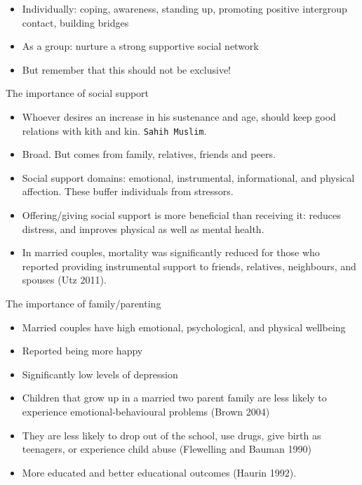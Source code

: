 \documentclass[
  ignorenonframetext,
  aspectratio=169,
]{beamer}
\providecommand{\tightlist}{%
  \setlength{\itemsep}{0pt}\setlength{\parskip}{0pt}}\usepackage{longtable,booktabs,array}
\begin{document}
\begin{frame}
\begin{itemize}[<+->]
\tightlist
\item
  Individually: coping, awareness, standing up, promoting positive
  intergroup contact, building bridges
\item
  As a group: nurture a strong supportive social network
\item
  But remember that this should not be exclusive!
\end{itemize}
\end{frame}

\begin{frame}[fragile]{The importance of social support}
\label{the-importance-of-social-support}
\begin{itemize}[<+->]
\tightlist
\item
  Whoever desires an increase in his sustenance and age, should keep
  good relations with kith and kin. \texttt{Sahih\ Muslim}.
\item
  Broad. But comes from family, relatives, friends and peers.
\item
  Social support domains: emotional, instrumental, informational, and
  physical affection. These buffer individuals from stressors.
\item
  Offering/giving social support is more beneficial than receiving it:
  reduces distress, and improves physical as well as mental health.
\item
  In married couples, mortality was significantly reduced for those who
  reported providing instrumental support to friends, relatives,
  neighbours, and spouses (Utz 2011).
\end{itemize}
\end{frame}

\begin{frame}{The importance of family/parenting}
\label{the-importance-of-familyparenting}
\begin{itemize}[<+->]
\tightlist
\item
  Married couples have high emotional, psychological, and physical
  wellbeing
\item
  Reported being more happy
\item
  Significantly low levels of depression
\item
  Children that grow up in a married two parent family are less likely
  to experience emotional-behavioural problems (Brown 2004)
\item
  They are less likely to drop out of the school, use drugs, give birth
  as teenagers, or experience child abuse (Flewelling and Bauman 1990)
\item
  More educated and better educational outcomes (Haurin 1992).
\end{itemize}
\end{frame}
\end{document}
